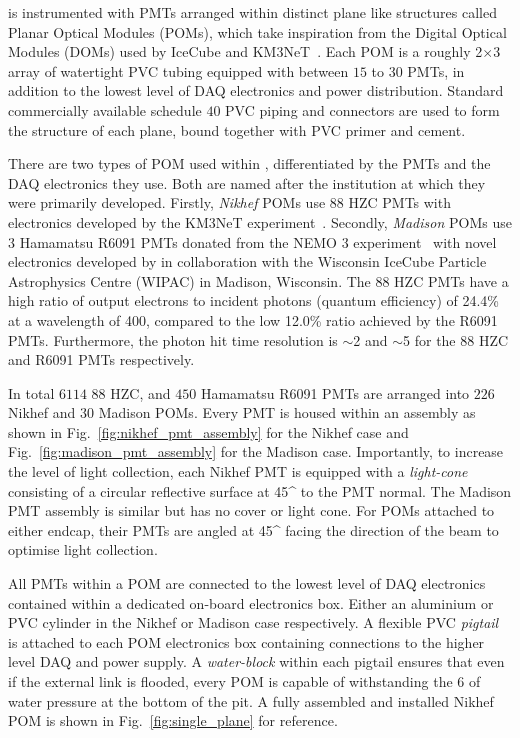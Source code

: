 \chipsfive is instrumented with PMTs arranged within distinct plane like structures called Planar
Optical Modules (POMs), which take inspiration from the Digital Optical Modules (DOMs) used by
IceCube and KM3NeT~\cite{hanson2006, eijk2015}. Each POM is a roughly
\unit{2}{}$\times$\unit{3}{} array of watertight PVC tubing equipped with
between $15$ to $30$ PMTs, in addition to the lowest level of DAQ electronics and power
distribution. Standard commercially available schedule $40$ PVC piping and connectors are used to
form the structure of each plane, bound together with PVC primer and cement.

There are two types of POM used within \chipsfive, differentiated by the PMTs and the DAQ
electronics they use. Both are named after the institution at which they were primarily developed.
Firstly, \emph{Nikhef} POMs use \unit{88}{} HZC PMTs with electronics developed by the
KM3NeT experiment~\cite{katz2009, adrian2016}. Secondly, \emph{Madison} POMs use
\unit{3}{} Hamamatsu R6091 PMTs donated from the NEMO 3 experiment~\cite{arnold2005}
with novel electronics developed by \chips in collaboration with the Wisconsin IceCube Particle
Astrophysics Centre (WIPAC) in Madison, Wisconsin. The \unit{88}{} HZC PMTs have a high
ratio of output electrons to incident photons (quantum efficiency) of 24.4\% at a wavelength of
\unit{400}{}, compared to the low 12.0\% ratio achieved by the R6091 PMTs. Furthermore,
the photon hit time resolution is $\sim$\unit{2}{} and $\sim$\unit{5}{} for
the \unit{88}{} HZC and R6091 PMTs respectively.

In total $6114$ \unit{88}{} HZC, and $450$ Hamamatsu R6091 PMTs are arranged into $226$
Nikhef and $30$ Madison POMs. Every PMT is housed within an assembly as shown in
Fig.~\ref{fig:nikhef_pmt_assembly} for the Nikhef case and Fig.~\ref{fig:madison_pmt_assembly} for
the Madison case. Importantly, to increase the level of light collection, each Nikhef PMT is
equipped with a \emph{light-cone} consisting of a circular reflective surface at \unit{45}{^\circ}
to the PMT normal. The Madison PMT assembly is similar but has no cover or light cone. For POMs
attached to either endcap, their PMTs are angled at \unit{45}{^\circ} facing the direction of the
beam to optimise light collection.

All PMTs within a POM are connected to the lowest level of DAQ electronics contained within a
dedicated on-board electronics box. Either an aluminium or PVC cylinder in the Nikhef or Madison
case respectively. A flexible PVC \emph{pigtail} is attached to each POM electronics box
containing connections to the higher level DAQ and power supply. A \emph{water-block} within each
pigtail ensures that even if the external link is flooded, every POM is capable of withstanding
the \unit{6}{} of water pressure at the bottom of the pit. A fully assembled and
installed Nikhef POM is shown in Fig.~\ref{fig:single_plane} for reference.

